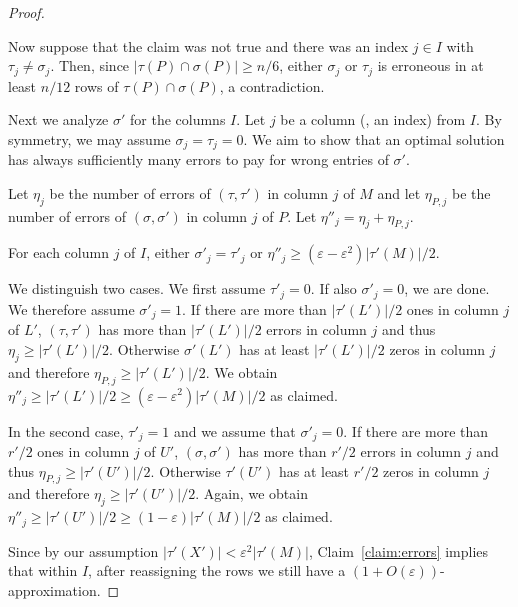 \begin{proof}
\begin{subproof}
        Now suppose that the claim was not true and there was an index $j \in I$ with $\tau_j \neq \sigma_j$.
        Then, since $|\tau(P) \cap \sigma(P)| \ge n/6$, either $\sigma_j$ or $\tau_j$ is erroneous in at least $n/12$ rows of $\tau(P) \cap \sigma(P)$, a contradiction.
    \end{subproof}

    Next we analyze $\sigma'$ for the columns $I$.
    Let $j$ be a column (\ie, an index) from $I$.
    By symmetry, we may assume $\sigma_j = \tau_j = 0$. 
    We aim to show that an optimal solution has always sufficiently many errors to pay for wrong entries of $\sigma'$.

    Let $\eta_j$ be the number of errors of $(\tau,\tau')$ in column $j$ of $M$ and
    let $\eta_{P,j}$ be the number of errors of $(\sigma,\sigma')$ in column $j$ of $P$.
    Let $\eta''_j = \eta_j + \eta_{P,j}$.
    \begin{claim}\label{claim:errors}
        For each column $j$ of $I$, either $\sigma'_j = \tau'_j$ or $\eta''_j \ge (\varepsilon-\varepsilon^2)|\tau'(M)|/2$.
    \end{claim}
    \begin{subproof}
        We distinguish two cases.
        We first assume $\tau'_j = 0$.
        If also $\sigma'_j = 0$, we are done. 
        We therefore assume $\sigma'_j = 1$.
        If there are more than $|\tau'(L')|/2$ ones in column $j$ of $L'$, $(\tau,\tau')$ has more than $|\tau'(L')|/2$ errors in column $j$ and thus 
        $\eta_j \ge |\tau'(L')|/2$.
        Otherwise $\sigma'(L')$ has at least $|\tau'(L')|/2$ zeros in column $j$ and therefore $\eta_{P,j} \ge |\tau'(L')|/2$.
        We obtain $\eta''_j \ge |\tau'(L')|/2 \ge (\varepsilon-\varepsilon^2) |\tau'(M)|/2$ as claimed.

        In the second case, $\tau'_j = 1$ and we assume that $\sigma'_j = 0$.
        If there are more than $r'/2$ ones in column $j$ of $U'$, $(\sigma,\sigma')$ has more than $r'/2$ errors in column $j$ and thus $\eta_{P,j} \ge |\tau'(U')|/2$.
        Otherwise $\tau'(U')$ has at least $r'/2$ zeros in column $j$ and therefore $\eta_j \ge |\tau'(U')|/2$.
        Again, we obtain $\eta''_j \ge |\tau'(U')|/2 \ge (1-\varepsilon) |\tau'(M)|/2$ as claimed.
    \end{subproof}

    Since by our assumption $|\tau'(X')| < \varepsilon^2 |\tau'(M)|$,
    Claim~\ref{claim:errors} implies that within $I$, after reassigning the rows we still have a $(1+ O(\varepsilon))$-approximation.


\end{proof}
